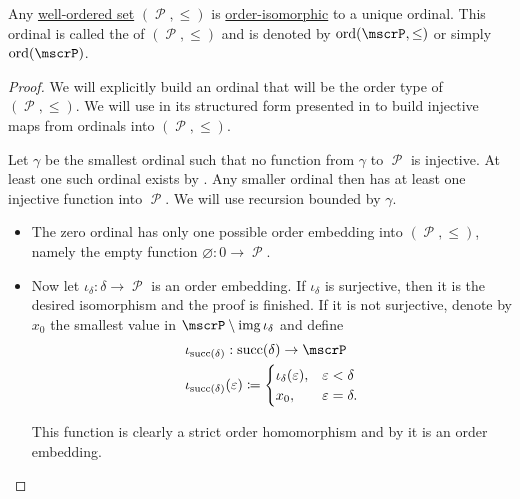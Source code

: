 \begin{proposition}\label{thm:order_type_existence}
  Any \hyperref[def:well_ordered_set]{well-ordered set} \( (\mscrP, \leq) \) is \hyperref[def:poset/homomorphism]{order-isomorphic} to a unique ordinal. This ordinal is called the  of \( (\mscrP, \leq) \) and is denoted by \( \ord(\mscrP, \leq) \) or simply \( \ord(\mscrP) \).
\end{proposition}
\begin{proof}
  We will explicitly build an ordinal that will be the order type of \( (\mscrP, \leq) \). We will use  in its structured form presented in  to build injective maps from ordinals into \( (\mscrP, \leq) \).

  Let \( \gamma \) be the smallest ordinal such that no function from \( \gamma \) to \( \mscrP \) is injective. At least one such ordinal exists by . Any smaller ordinal then has at least one injective function into \( \mscrP \). We will use recursion bounded by \( \gamma \).

  \begin{itemize}
    \item The zero ordinal has only one possible order embedding into \( (\mscrP, \leq) \), namely the empty function \( \varnothing: 0 \to \mscrP \).

    \item Now let \( \iota_\delta: \delta \to \mscrP \) is an order embedding. If \( \iota_\delta \) is surjective, then it is the desired isomorphism and the proof is finished. If it is not surjective, denote by \( x_0 \) the smallest value in \( \mscrP \setminus \img \iota_\delta \) and define
    \begin{equation*}
      \begin{aligned}
        &\iota_{\op{succ}(\delta)}: \op{succ}(\delta) \to \mscrP \\
        &\iota_{\op{succ}(\delta)}(\varepsilon) \coloneqq \begin{cases}
          \iota_\delta(\varepsilon), &\varepsilon < \delta \\
          x_0,           &\varepsilon = \delta.
        \end{cases}
      \end{aligned}
    \end{equation*}

    This function is clearly a strict order homomorphism and by  it is an order embedding.


\end{itemize}
\end{proof}
